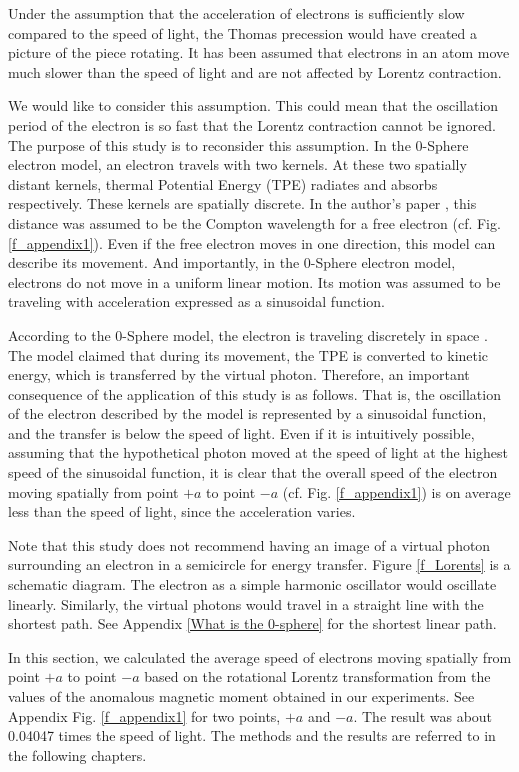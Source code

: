 \documentclass[%
 reprint,
 amsmath,amssymb,
 aps,
]{revtex4-1}
\numberwithin{equation}{section}%
\begin{document}
Under the assumption that the acceleration of electrons is sufficiently slow compared to the speed of light, the Thomas precession would have created a picture of the piece rotating. It has been assumed that electrons in an atom move much slower than the speed of light and are not affected by Lorentz contraction.

We would like to consider this assumption. This could mean that the oscillation period of the electron is so fast that the Lorentz contraction cannot be ignored. The purpose of this study is to reconsider this assumption. In the 0-Sphere electron model, an electron travels with two kernels. At these two spatially distant kernels, thermal Potential Energy (TPE) radiates and absorbs respectively. These kernels are spatially discrete. In the author's paper \cite{Hanamura1}, this distance was assumed to be the Compton wavelength for a free electron (cf. Fig. \ref{f_appendix1}). Even if the free electron moves in one direction, this model can describe its movement. And importantly, in the 0-Sphere electron model, electrons do not move in a uniform linear motion. Its motion was assumed to be traveling with acceleration expressed as a sinusoidal function.

According to the 0-Sphere model, the electron is traveling discretely in space \cite{Hanamura2}. The model claimed that during its movement, the TPE is converted to kinetic energy, which is transferred by the virtual photon. Therefore, an important consequence of the application of this study is as follows. That is, the oscillation of the electron described by the model is represented by a sinusoidal function, and the transfer is below the speed of light. Even if it is intuitively possible, assuming that the hypothetical photon moved at the speed of light at the highest speed of the sinusoidal function, it is clear that the overall speed of the electron moving spatially from point $+a$ to point $-a$ (cf. Fig. \ref{f_appendix1}) is on average less than the speed of light, since the acceleration varies.

Note that this study does not recommend having an image of a virtual photon surrounding an electron in a semicircle for energy transfer. Figure \ref{f_Lorents} is a schematic diagram. The electron as a simple harmonic oscillator would oscillate linearly. Similarly, the virtual photons would travel in a straight line with the shortest path. See Appendix \ref{What is the 0-sphere} for the shortest linear path.

In this section, we calculated the average speed of electrons moving spatially from point $+a$ to point $-a$ based on the rotational Lorentz transformation from the values of the anomalous magnetic moment obtained in our experiments. See Appendix Fig. \ref{f_appendix1} for two points, $+a$ and $-a$. The result was about 0.04047 times the speed of light. The methods and the results are referred to in the following chapters.
\end{document}
